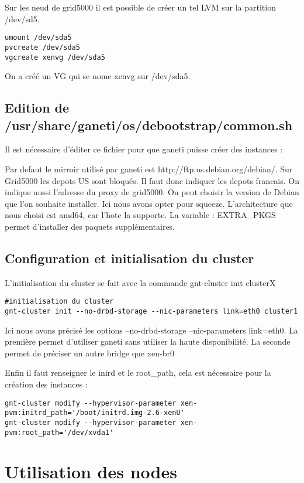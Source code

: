 Sur les neud de grid5000 il est possible de créer un tel LVM sur la partition /dev/sd5.
\begin{lstlisting}
umount /dev/sda5
pvcreate /dev/sda5
vgcreate xenvg /dev/sda5
\end{lstlisting}
On a créé un VG qui se nome xenvg sur /dev/sda5.

\subsection {Edition de /usr/share/ganeti/os/debootstrap/common.sh}

Il est nécessaire d'éditer ce fichier pour que ganeti puisse créer des instances :

Par defaut le mirroir utilisé par ganeti est http://ftp.us.debian.org/debian/. Sur Grid5000 les depots US sont bloqués. Il faut donc indiquer les depots francais.
On indique aussi l'adresse du  proxy de grid5000.
On peut choisir la version de Debian que l'on souhaite installer. Ici nous avons opter pour squeeze.
L'architecture que nous choisi est amd64, car l'hote la supporte.
La variable : EXTRA_PKGS permet d'installer des paquets supplémentaires.

\subsection {Configuration et initialisation du cluster}
L'initialisation du cluster se fait avec la commande gnt-cluster init clusterX
\begin{lstlisting}
#initialisation du cluster
gnt-cluster init --no-drbd-storage --nic-parameters link=eth0 cluster1
\end{lstlisting}
Ici nous avons précisé les options --no-drbd-storage --nic-parameters link=eth0.
La première permet d'utiliser ganeti sans utiliser la haute disponibilité.
La seconde permet de préciser un autre bridge que xen-br0

Enfin il faut renseigner le inird et le root_path, cela est nécessaire pour la création des instances :
\begin{lstlisting}
gnt-cluster modify --hypervisor-parameter xen-pvm:initrd_path='/boot/initrd.img-2.6-xenU'
gnt-cluster modify --hypervisor-parameter xen-pvm:root_path='/dev/xvda1'
\end{lstlisting}  

\section {Utilisation des nodes}
